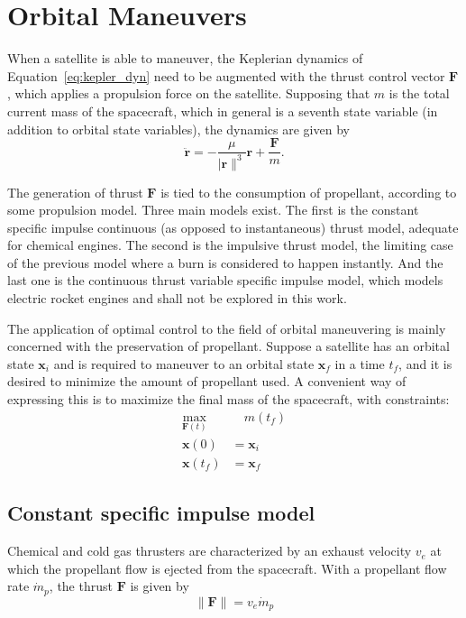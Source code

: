 \section{Orbital Maneuvers}

When a satellite is able to maneuver, the Keplerian dynamics of Equation~\eqref{eq:kepler_dyn} need to be augmented with the thrust control vector \(\mathbf{F}\), which applies a propulsion force on the satellite. Supposing that \(m\) is the total current mass of the spacecraft, which in general is a seventh state variable (in addition to orbital state variables), the dynamics are given by
\begin{equation}
    \ddot{\mathbf{r}} = -\frac{\mu}{\lvert \mathbf{r} \rVert^3}\mathbf{r} + \frac{\mathbf{F}}{m}.
\end{equation}

The generation of thrust \(\mathbf{F}\) is tied to the consumption of propellant, according to some propulsion model. Three main models exist. The first is the constant specific impulse continuous (as opposed to instantaneous) thrust model, adequate for chemical engines. The second is the impulsive thrust model, the limiting case of the previous model where a burn is considered to happen instantly. And the last one is the continuous thrust variable specific impulse model, which models electric rocket engines and shall not be explored in this work.

The application of optimal control to the field of orbital maneuvering is mainly concerned with the preservation of propellant. Suppose a satellite has an orbital state \(\mathbf{x}_i\) and is required to maneuver to an orbital state \(\mathbf{x}_f\) in a time \(t_f\), and it is desired to minimize the amount of propellant used. A convenient way of expressing this is to maximize the final mass of the spacecraft, with constraints:
\begin{align}
    \max_{\mathbf{F}(t)}&\quad m(t_f) \label{eq:max_final_mass} \\
    \mathbf{x}(0) &= \mathbf{x}_i \\
    \mathbf{x}(t_f) &= \mathbf{x}_f
\end{align}

\subsection{Constant specific impulse model}

Chemical and cold gas thrusters are characterized by an exhaust velocity \(v_e\) at which the propellant flow is ejected from the spacecraft. With a propellant flow rate \(\dot{m}_p\), the thrust \(\mathbf{F}\) is given by
\begin{equation}
   \lVert \mathbf{F} \rVert = v_e \dot{m}_p
\end{equation}

